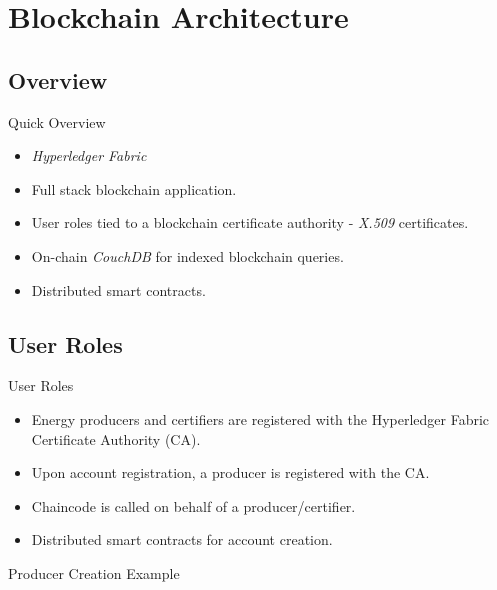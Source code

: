 \section{Blockchain Architecture}
\subsection{Overview}
\begin{frame}{Quick Overview}
    \begin{itemize}
        \item \textit{Hyperledger Fabric}
        \item Full stack blockchain application.
        \item User roles tied to a blockchain
              certificate authority - \textit{X.509} certificates.
        \item On-chain \textit{CouchDB} for indexed blockchain queries.
        \item Distributed smart contracts.
    \end{itemize}
\end{frame}
\subsection{User Roles}
\begin{frame}{User Roles}
    \begin{itemize}
        \item Energy producers and certifiers are registered with the
              Hyperledger Fabric Certificate Authority (CA).
        \item Upon account registration, a producer is registered with the CA.
        \item Chaincode is called on behalf of a producer/certifier.
        \item Distributed smart contracts for account creation.
    \end{itemize}
\end{frame}
\begin{frame}{Producer Creation Example}
    \begin{adjustbox}{max totalsize={1\textwidth}{0.85\textheight},center}
        
    \end{adjustbox}
\end{frame}
